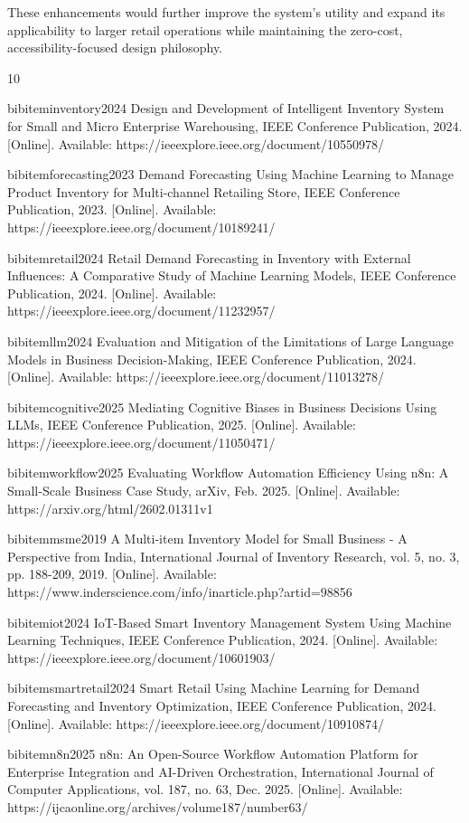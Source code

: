 \documentclass[journal]{IEEEtran}
\begin{document}
These enhancements would further improve the system's utility and expand its applicability to larger retail operations while maintaining the zero-cost, accessibility-focused design philosophy.

\begin{thebibliography}{10}

bibitem{inventory2024}
Design and Development of Intelligent Inventory System for Small and Micro Enterprise Warehousing, IEEE Conference Publication, 2024. [Online]. Available: https://ieeexplore.ieee.org/document/10550978/

bibitem{forecasting2023}
Demand Forecasting Using Machine Learning to Manage Product Inventory for Multi-channel Retailing Store, IEEE Conference Publication, 2023. [Online]. Available: https://ieeexplore.ieee.org/document/10189241/

bibitem{retail2024}
Retail Demand Forecasting in Inventory with External Influences: A Comparative Study of Machine Learning Models, IEEE Conference Publication, 2024. [Online]. Available: https://ieeexplore.ieee.org/document/11232957/

bibitem{llm2024}
Evaluation and Mitigation of the Limitations of Large Language Models in Business Decision-Making, IEEE Conference Publication, 2024. [Online]. Available: https://ieeexplore.ieee.org/document/11013278/

bibitem{cognitive2025}
Mediating Cognitive Biases in Business Decisions Using LLMs, IEEE Conference Publication, 2025. [Online]. Available: https://ieeexplore.ieee.org/document/11050471/

bibitem{workflow2025}
Evaluating Workflow Automation Efficiency Using n8n: A Small-Scale Business Case Study, arXiv, Feb. 2025. [Online]. Available: https://arxiv.org/html/2602.01311v1

bibitem{msme2019}
A Multi-item Inventory Model for Small Business - A Perspective from India, International Journal of Inventory Research, vol. 5, no. 3, pp. 188-209, 2019. [Online]. Available: https://www.inderscience.com/info/inarticle.php?artid=98856

bibitem{iot2024}
IoT-Based Smart Inventory Management System Using Machine Learning Techniques, IEEE Conference Publication, 2024. [Online]. Available: https://ieeexplore.ieee.org/document/10601903/

bibitem{smartretail2024}
Smart Retail Using Machine Learning for Demand Forecasting and Inventory Optimization, IEEE Conference Publication, 2024. [Online]. Available: https://ieeexplore.ieee.org/document/10910874/

bibitem{n8n2025}
n8n: An Open-Source Workflow Automation Platform for Enterprise Integration and AI-Driven Orchestration, International Journal of Computer Applications, vol. 187, no. 63, Dec. 2025. [Online]. Available: https://ijcaonline.org/archives/volume187/number63/

\end{thebibliography}
\end{document}
